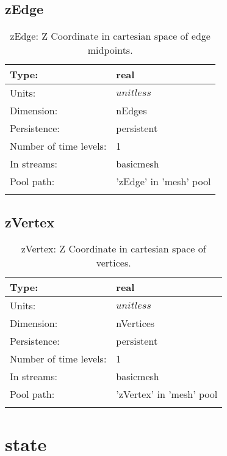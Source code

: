 \subsection[zEdge]{zEdge}
\label{subsec:var_sec_mesh_zEdge}
\begin{center}
\begin{longtable}{| p{2.0in} | p{4.0in} |}
        \hline 
        Type: & real \\
        \hline 
        Units: & $unitless$ \\
        \hline 
        Dimension: & nEdges \\
        \hline 
        Persistence: & persistent \\
        \hline 
        Number of time levels: & 1 \\
        \hline 
		 In streams: &  basicmesh \\
        \hline 
            Pool path: & 'zEdge' in 'mesh' pool
 \\
		 \hline 
    \caption{zEdge: Z Coordinate in cartesian space of edge midpoints.}
\end{longtable}
\end{center}
\subsection[zVertex]{zVertex}
\label{subsec:var_sec_mesh_zVertex}
\begin{center}
\begin{longtable}{| p{2.0in} | p{4.0in} |}
        \hline 
        Type: & real \\
        \hline 
        Units: & $unitless$ \\
        \hline 
        Dimension: & nVertices \\
        \hline 
        Persistence: & persistent \\
        \hline 
        Number of time levels: & 1 \\
        \hline 
		 In streams: &  basicmesh \\
        \hline 
            Pool path: & 'zVertex' in 'mesh' pool
 \\
		 \hline 
    \caption{zVertex: Z Coordinate in cartesian space of vertices.}
\end{longtable}
\end{center}
\section[state]{state}
\label{sec:var_sec_state}
